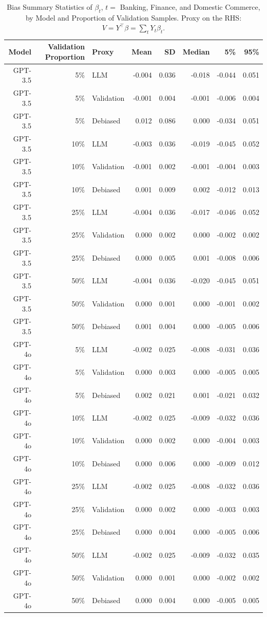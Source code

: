 \begin{table}

\caption{Bias Summary Statistics of $\beta_{t}$, $t=$ Banking, Finance, and Domestic Commerce, by Model and Proportion of Validation Samples. Proxy on the RHS: $V = Y^\top \beta = \sum_{t} Y_t \beta_t$.}
\centering
\begin{tabular}[t]{rrlrrrrr}
\toprule
Model & Validation Proportion & Proxy & Mean & SD & Median & 5\% & 95\%\\
\midrule
GPT-3.5 & 5\% & LLM & -0.004 & 0.036 & -0.018 & -0.044 & 0.051\\
GPT-3.5 & 5\% & Validation & -0.001 & 0.004 & -0.001 & -0.006 & 0.004\\
GPT-3.5 & 5\% & Debiased & 0.012 & 0.086 & 0.000 & -0.034 & 0.051\\
GPT-3.5 & 10\% & LLM & -0.003 & 0.036 & -0.019 & -0.045 & 0.052\\
GPT-3.5 & 10\% & Validation & -0.001 & 0.002 & -0.001 & -0.004 & 0.003\\
GPT-3.5 & 10\% & Debiased & 0.001 & 0.009 & 0.002 & -0.012 & 0.013\\
GPT-3.5 & 25\% & LLM & -0.004 & 0.036 & -0.017 & -0.046 & 0.052\\
GPT-3.5 & 25\% & Validation & 0.000 & 0.002 & 0.000 & -0.002 & 0.002\\
GPT-3.5 & 25\% & Debiased & 0.000 & 0.005 & 0.001 & -0.008 & 0.006\\
GPT-3.5 & 50\% & LLM & -0.004 & 0.036 & -0.020 & -0.045 & 0.051\\
GPT-3.5 & 50\% & Validation & 0.000 & 0.001 & 0.000 & -0.001 & 0.002\\
GPT-3.5 & 50\% & Debiased & 0.001 & 0.004 & 0.000 & -0.005 & 0.006\\
GPT-4o & 5\% & LLM & -0.002 & 0.025 & -0.008 & -0.031 & 0.036\\
GPT-4o & 5\% & Validation & 0.000 & 0.003 & 0.000 & -0.005 & 0.005\\
GPT-4o & 5\% & Debiased & 0.002 & 0.021 & 0.001 & -0.021 & 0.032\\
GPT-4o & 10\% & LLM & -0.002 & 0.025 & -0.009 & -0.032 & 0.036\\
GPT-4o & 10\% & Validation & 0.000 & 0.002 & 0.000 & -0.004 & 0.003\\
GPT-4o & 10\% & Debiased & 0.000 & 0.006 & 0.000 & -0.009 & 0.012\\
GPT-4o & 25\% & LLM & -0.002 & 0.025 & -0.008 & -0.032 & 0.036\\
GPT-4o & 25\% & Validation & 0.000 & 0.002 & 0.000 & -0.003 & 0.003\\
GPT-4o & 25\% & Debiased & 0.000 & 0.004 & 0.000 & -0.005 & 0.006\\
GPT-4o & 50\% & LLM & -0.002 & 0.025 & -0.009 & -0.032 & 0.035\\
GPT-4o & 50\% & Validation & 0.000 & 0.001 & 0.000 & -0.002 & 0.002\\
GPT-4o & 50\% & Debiased & 0.000 & 0.004 & 0.000 & -0.005 & 0.005\\
\bottomrule
\end{tabular}
\end{table}
